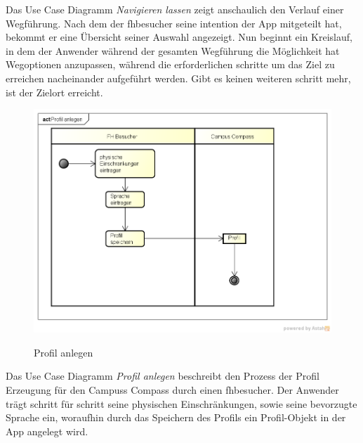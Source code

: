 Das Use Case Diagramm \emph{Navigieren lassen} zeigt anschaulich den Verlauf einer Wegführung. Nach dem der \gls{fhbesucher} seine \gls{intention} der App mitgeteilt hat, bekommt er eine Übersicht seiner Auswahl angezeigt. Nun beginnt ein Kreislauf, in dem der Anwender während der gesamten Wegführung die Möglichkeit hat Wegoptionen anzupassen, während die erforderlichen \gls{schritt}e um das Ziel zu erreichen nacheinander aufgeführt werden. Gibt es keinen weiteren \gls{schritt} mehr, ist der Zielort erreicht.

\begin{figure}[hbt]
  \centering
  \includegraphics[width=\linewidth]{img/akt_profil_anlegen.png}
  \label{img:akt_profil_anlegen}
  \caption{Profil anlegen}
\end{figure}

\noindent Das Use Case Diagramm \emph{Profil anlegen} beschreibt den Prozess der Profil Erzeugung für den Campuss Compass durch einen \gls{fhbesucher}. Der Anwender trägt \gls{schritt} für \gls{schritt} seine physischen Einschränkungen, sowie seine bevorzugte Sprache ein, woraufhin durch das Speichern des Profils ein Profil-Objekt in der App angelegt wird.
